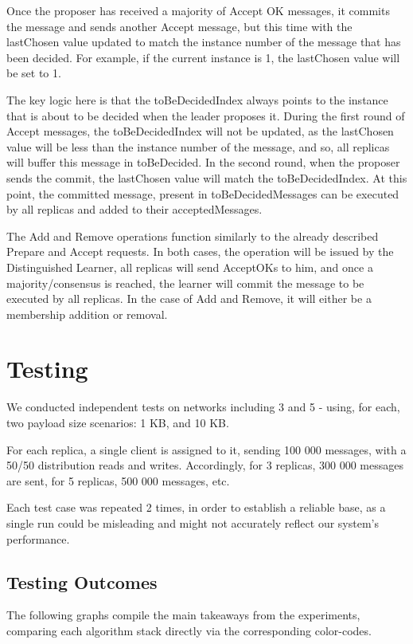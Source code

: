 \documentclass[sigconf]{acmart}
\begin{document}
Once the proposer has received a majority of Accept OK messages, it commits the message and sends another Accept message, but this time with the lastChosen value updated to match the instance number of the message that has been decided. For example, if the current instance is 1, the lastChosen value will be set to 1.

The key logic here is that the toBeDecidedIndex always points to the instance that is about to be decided when the leader proposes it. During the first round of Accept messages, the toBeDecidedIndex will not be updated, as the lastChosen value will be less than the instance number of the message, and so, all replicas will buffer this message in toBeDecided. In the second round, when the proposer sends the commit, the lastChosen value will match the toBeDecidedIndex. At this point, the committed message, present in toBeDecidedMessages can be executed by all replicas and added to their acceptedMessages.

The Add and Remove operations function similarly to the already described Prepare and Accept requests. In both cases, the operation will be issued by the Distinguished Learner, all replicas will send AcceptOKs to him, and once a majority/consensus is reached, the learner will commit the message to be executed by all replicas. In the case of Add and Remove, it will either be a membership addition or removal.

\section{Testing}
We conducted independent tests on networks including 3 and 5 - using, for each, two payload size scenarios: 1 KB, and 10 KB.

For each replica, a single client is assigned to it, sending 100 000 messages, with a 50/50 distribution reads and writes. Accordingly, for 3 replicas, 300 000 messages are sent, for 5 replicas, 500 000 messages, etc.

Each test case was repeated 2 times, in order to establish a reliable base, as a single run could be misleading and might not accurately reflect our system's performance.

\subsection{Testing Outcomes}

The following graphs compile the main takeaways from the experiments, comparing each algorithm stack directly via the corresponding color-codes. 
\end{document}
